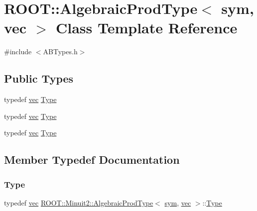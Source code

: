 \hypertarget{classROOT_1_1Minuit2_1_1AlgebraicProdType_3_01sym_00_01vec_01_4}{}\section{R\+O\+OT\+:\+:Algebraic\+Prod\+Type$<$ sym, vec $>$ Class Template Reference}
\label{classROOT_1_1Minuit2_1_1AlgebraicProdType_3_01sym_00_01vec_01_4}


{\ttfamily \#include $<$A\+B\+Types.\+h$>$}

\subsection*{Public Types}
\begin{DoxyCompactItemize}
\item 
typedef \mbox{\hyperlink{classROOT_1_1Minuit2_1_1vec}{vec}} \mbox{\hyperlink{classROOT_1_1Minuit2_1_1AlgebraicProdType_3_01sym_00_01vec_01_4_ad796e20c26ea6b960299e66820ca3c2c}{Type}}
\item 
typedef \mbox{\hyperlink{classROOT_1_1Minuit2_1_1vec}{vec}} \mbox{\hyperlink{classROOT_1_1Minuit2_1_1AlgebraicProdType_3_01sym_00_01vec_01_4_ad796e20c26ea6b960299e66820ca3c2c}{Type}}
\item 
typedef \mbox{\hyperlink{classROOT_1_1Minuit2_1_1vec}{vec}} \mbox{\hyperlink{classROOT_1_1Minuit2_1_1AlgebraicProdType_3_01sym_00_01vec_01_4_ad796e20c26ea6b960299e66820ca3c2c}{Type}}
\end{DoxyCompactItemize}


\subsection{Member Typedef Documentation}
\mbox{\label{classROOT_1_1Minuit2_1_1AlgebraicProdType_3_01sym_00_01vec_01_4_ad796e20c26ea6b960299e66820ca3c2c}} 
\subsubsection{\texorpdfstring{Type}{Type}\hspace{0.1cm}{\footnotesize\ttfamily [1/3]}}
{\footnotesize\ttfamily typedef \mbox{\hyperlink{classROOT_1_1Minuit2_1_1vec}{vec}} \mbox{\hyperlink{classROOT_1_1Minuit2_1_1AlgebraicProdType}{R\+O\+O\+T\+::\+Minuit2\+::\+Algebraic\+Prod\+Type}}$<$ \mbox{\hyperlink{classROOT_1_1Minuit2_1_1sym}{sym}}, \mbox{\hyperlink{classROOT_1_1Minuit2_1_1vec}{vec}} $>$\+::\mbox{\hyperlink{classROOT_1_1Minuit2_1_1AlgebraicProdType_3_01sym_00_01vec_01_4_ad796e20c26ea6b960299e66820ca3c2c}{Type}}}

